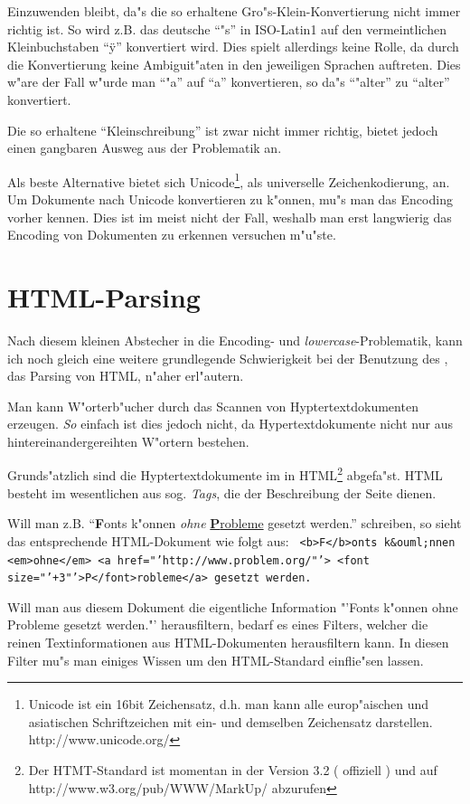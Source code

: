 Einzuwenden bleibt, da"s die so erhaltene Gro"s-Klein-Konvertierung nicht immer richtig ist. So wird z.B. das deutsche "`"s"' in ISO-Latin1 auf den vermeintlichen Kleinbuchstaben "`\"y"' konvertiert wird. Dies spielt allerdings keine Rolle, da durch die Konvertierung keine Ambiguit"aten in den jeweiligen Sprachen auftreten. Dies w"are der Fall w"urde man "`"a"' auf "`a"' konvertieren, so da"s "`"alter"' zu "`alter"' konvertiert.

Die so erhaltene "`Kleinschreibung"' ist zwar nicht immer richtig, bietet jedoch einen gangbaren Ausweg aus der Problematik an.

Als beste Alternative bietet sich Unicode\footnote{Unicode ist ein 16bit Zeichensatz, d.h. man kann alle europ"aischen und asiatischen Schriftzeichen mit ein- und demselben Zeichensatz darstellen. http://www.unicode.org/}, als universelle Zeichenkodierung, an. Um Dokumente nach Unicode konvertieren zu k"onnen, mu"s man das Encoding vorher kennen. Dies ist im \www meist nicht der Fall, weshalb man erst langwierig das Encoding von Dokumenten zu erkennen versuchen m"u"ste.


\section{HTML-Parsing}

Nach diesem kleinen Abstecher in die Encoding- und {\em lowercase}-Problematik, kann ich noch gleich eine weitere grundlegende Schwierigkeit bei der Benutzung des \www , das Parsing von HTML, n"aher erl"autern.

Man kann W"orterb"ucher durch das Scannen von Hyptertextdokumenten erzeugen. {\em So} einfach ist dies jedoch nicht, da Hypertextdokumente nicht nur aus hintereinandergereihten W"ortern bestehen.

Grunds"atzlich sind die Hyptertextdokumente im \www in HTML\footnote{Der HTMT-Standard ist momentan in der Version 3.2 ( offiziell ) und auf http://www.w3.org/pub/WWW/MarkUp/ abzurufen} abgefa"st. HTML besteht im wesentlichen aus sog. {\em Tags}, die der Beschreibung der Seite dienen.

Will man z.B. "`{\bf F}onts k"onnen {\em ohne} \underline{{\bf P}robleme} gesetzt werden."' schreiben, so sieht das entsprechende HTML-Dokument wie folgt aus:
{\tt
\nl \nl
<b>F</b>onts k\&ouml;nnen <em>ohne</em> \nl
<a href="'http://www.problem.org/"'>	\nl
<font size="'+3"'>P</font>robleme</a> gesetzt werden.\nl}

Will man aus diesem Dokument die eigentliche Information "'Fonts k"onnen ohne Probleme gesetzt werden."' herausfiltern, bedarf es eines Filters, welcher die reinen Textinformationen aus HTML-Dokumenten herausfiltern kann. In diesen Filter mu"s man einiges Wissen um den HTML-Standard einflie"sen lassen.

